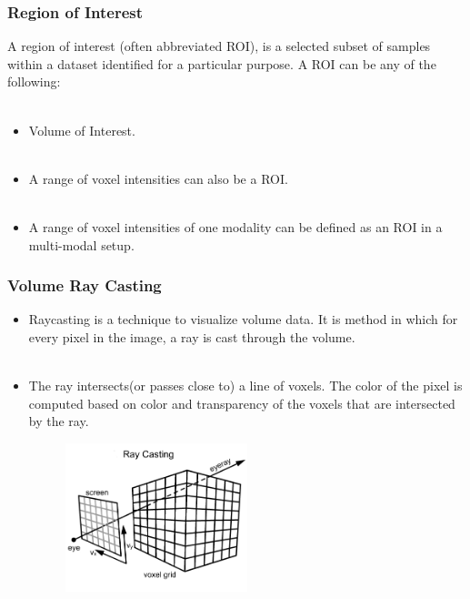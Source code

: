 \documentclass{beamer}
\begin{document}
\begin{frame}
\frametitle{Region of Interest}
A region of interest (often abbreviated ROI), is a selected subset of samples within a dataset identified for a particular purpose. A ROI can be any of the following: \\ $ $
\begin{itemize}
\item Volume of Interest. \\ $ $
\item A range of voxel intensities can also be a ROI. \\ $ $
\item A range of voxel intensities of one modality can be defined as an ROI in a multi-modal setup.
\end{itemize}
\end{frame}



\begin{frame}
\frametitle{Volume Ray Casting}
\begin{itemize}
\item Raycasting is a technique to visualize volume data. It is method in which for every pixel in the image, a ray is cast through the volume. \\ $ $
\item The ray intersects(or passes close to) a line of voxels. The color of the pixel is computed based on color and transparency of the voxels that are intersected by the ray.
\begin{figure}
\centering
\includegraphics[width=150pt,heigth=280pt]{ray_cast1.jpg}
\end{figure}
\end{itemize}
\end{frame}

\end{document}
